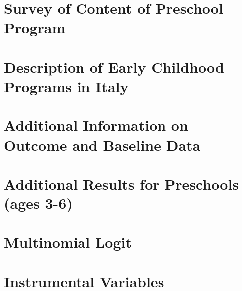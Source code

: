 \begin{appendices}

\section{Survey of Content of Preschool Program}
\label{sec:survey}


\section{Description of Early Childhood Programs in Italy}
\label{sec:programdes}


\section{Additional Information on Outcome and Baseline Data}
\label{sec:data-app}


\section{Additional Results for Preschools (ages 3-6)}
\label{sec:results}


\section{Multinomial Logit}
\label{sec:multi-logit}

\clearpage

\section{Instrumental Variables}
\label{sec:iv}

\clearpage


\end{appendices}





